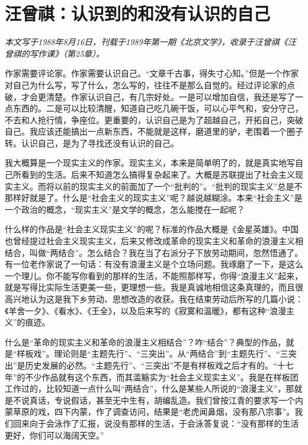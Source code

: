 \documentclass[fontset=fandol,12pt,a5paper]{ctexbook}
\begin{document}
\newpage

\section{汪曾祺：认识到的和没有认识的自己}

\emph{本文写于1988年8月16日，刊载于1989年第一期《北京文学》，收录于汪曾祺《汪曾祺的写作课》（第25章）。}
\vspace{2em}

作家需要评论家。作家需要认识自己。“文章千古事，得失寸心知。”但是一个作家对自己为什么写，写了什么，怎么写的，往往不是那么自觉的。经过评论家的点破，才会更清楚。作家认识自己，有几宗好处。一是可以增加自信，我还是写了一点东西的。二是可以比较清醒，知道自己吃几碗干饭，可以心平气和，安分守己，不去和人抢行情，争座位。更重要的，认识自己是为了超越自己，开拓自己，突破自己。我应该还能搞出一点新东西，不能就是这样，磨道里的驴，老围着一个圈子转。认识自己，是为了寻找还没有认识的自己。

我大概算是一个现实主义的作家。现实主义，本来是简单明了的，就是真实地写自己所看到的生活。后来不知道怎么搞得复杂起来了。大概是苏联提出了社会主义现实主义。而将以前的现实主义的前面加了一个“批判的”。“批判的现实主义”总是不那样好就是了。什么是“社会主义的现实主义”呢？越说越糊涂。本来“社会主义”是一个政治的概念，“现实主义”是文学的概念，怎么能搅在一起呢？

什么样的作品是“社会主义现实主义”的呢？标准的作品大概是《金星英雄》。中国也曾经提过社会主义现实主义，后来又修改成革命的现实主义和革命的浪漫主义相结合，叫做“两结合”。怎么结合？我在当了右派分子下放劳动期间，忽然悟通了。有一位老作家说了一句话：有没有浪漫主义是个立场问题。我琢磨了一下，是这么一个理儿。你不能写你看到的那样的生活，不能照那样写，你得“浪漫主义”起来，就是写得比实际生活更美一些，更理想一些。我是真诚地相信这条真理的，而且很高兴地认为这是我下乡劳动、思想改造的收获。我在结束劳动后所写的几篇小说：《羊舍一夕》、《看水》、《王全》，以及后来写的《寂寞和温暖》，都有这种“浪漫主义”的痕迹。

什么是“革命的现实主义和革命的浪漫主义相结合”？咋“结合”？典型的作品，就是“样板戏”。理论则是“主题先行”、“三突出”。从“两结合”到“主题先行”、“三突出”是历史发展的必然。“主题先行”、“三突出”不是有样板戏之后才有的。“十七年”的不少作品就有这个东西，而其滥觞实为“社会主义现实主义”。我是在样板团工作过的，比较知道一点什么叫“两结合”，什么是某些人所说的“浪漫主义”，那就是不说真话，专说假话，甚至无中生有，胡编乱造。我们曾按江青的要求写一个内蒙草原的戏，四下内蒙，作了调查访问，结果是“老虎闻鼻烟，没有那八宗事”。我们回来向于会泳作了汇报，说没有那样的生活，于会泳答复说：“没有那样的生活更好，你们可以海阔天空。”
\end{document}

